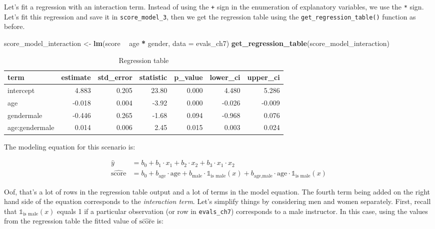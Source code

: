 \documentclass[12pt,]{krantz}
\makeatletter
\newenvironment{Shaded}{\begin{snugshade}}{\end{snugshade}}
\newcommand{\KeywordTok}[1]{\textcolor[rgb]{0.27,0.27,0.27}{\textbf{#1}}}
\newcommand{\DataTypeTok}[1]{\textcolor[rgb]{0.27,0.27,0.27}{#1}}
\newcommand{\StringTok}[1]{\textcolor[rgb]{0.5,0.5,0.5}{#1}}
\newcommand{\OperatorTok}[1]{\textcolor[rgb]{0.43,0.43,0.43}{\textbf{#1}}}
\newcommand{\NormalTok}[1]{#1}
\newenvironment{kframe}{%
\medskip{}
\setlength{\fboxsep}{.8em}
 \def\at@end@of@kframe{}%
 \ifinner\ifhmode%
  \def\at@end@of@kframe{\end{minipage}}%
  \begin{minipage}{\columnwidth}%
 \fi\fi%
 \def\FrameCommand##1{\hskip\@totalleftmargin \hskip-\fboxsep
 \colorbox{shadecolor}{##1}\hskip-\fboxsep
     \hskip-\linewidth \hskip-\@totalleftmargin \hskip\columnwidth}%
 \MakeFramed {\advance\hsize-\width
   \@totalleftmargin\z@ \linewidth\hsize
   \@setminipage}}%
 {\par\unskip\endMakeFramed%
 \at@end@of@kframe}
\renewenvironment{Shaded}{\begin{kframe}}{\end{kframe}}
\theoremstyle{definition}
\theoremstyle{definition}
\theoremstyle{definition}
\theoremstyle{remark}
\makeatother
\begin{document}
Let's fit a regression with an interaction term. Instead of using the
\texttt{+} sign in the enumeration of explanatory variables, we use the
\texttt{*} sign. Let's fit this regression and save it in
\texttt{score\_model\_3}, then we get the regression table using the
\texttt{get\_regression\_table()} function as before.

\begin{Shaded}
\begin{Highlighting}[]
\NormalTok{score_model_interaction <-}\StringTok{ }\KeywordTok{lm}\NormalTok{(score }\OperatorTok{~}\StringTok{ }\NormalTok{age }\OperatorTok{*}\StringTok{ }\NormalTok{gender, }\DataTypeTok{data =}\NormalTok{ evals_ch7)}
\KeywordTok{get_regression_table}\NormalTok{(score_model_interaction)}
\end{Highlighting}
\end{Shaded}

\begin{table}[H]

\caption{\label{tab:unnamed-chunk-253}Regression table}
\centering
\fontsize{10}{12}\selectfont
\begin{tabular}[t]{lrrrrrr}
\toprule
term & estimate & std\_error & statistic & p\_value & lower\_ci & upper\_ci\\
\midrule
intercept & 4.883 & 0.205 & 23.80 & 0.000 & 4.480 & 5.286\\
age & -0.018 & 0.004 & -3.92 & 0.000 & -0.026 & -0.009\\
gendermale & -0.446 & 0.265 & -1.68 & 0.094 & -0.968 & 0.076\\
age:gendermale & 0.014 & 0.006 & 2.45 & 0.015 & 0.003 & 0.024\\
\bottomrule
\end{tabular}
\end{table}

The modeling equation for this scenario is:

\begin{align}
\widehat{y} &= b_0 + b_1 \cdot x_1 + b_2 \cdot x_2 + b_3 \cdot x_1 \cdot x_2\\
\widehat{\mbox{score}} &= b_0 + b_{\mbox{age}} \cdot \mbox{age} + b_{\mbox{male}} \cdot \mathbb{1}_{\mbox{is male}}(x) + b_{\mbox{age,male}} \cdot \mbox{age} \cdot \mathbb{1}_{\mbox{is male}}(x)
\end{align}

Oof, that's a lot of rows in the regression table output and a lot of
terms in the model equation. The fourth term being added on the right
hand side of the equation corresponds to the \emph{interaction term}.
Let's simplify things by considering men and women separately. First,
recall that \(\mathbb{1}_{\mbox{is male}}(x)\) equals 1 if a particular
observation (or row in \texttt{evals\_ch7}) corresponds to a male
instructor. In this case, using the values from the regression table the
fitted value of \(\widehat{\mbox{score}}\) is:
\end{document}
